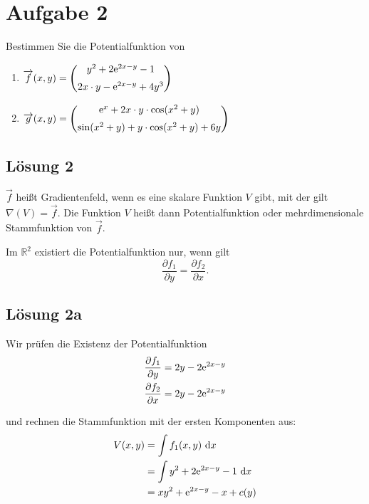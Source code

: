 \documentclass[main.tex]{subfiles}
\begin{document}
\section{Aufgabe 2}
Bestimmen Sie die Potentialfunktion von
\begin{enumerate}
	\item $\begin{aligned}
		\overrightarrow{f}(x,y) 
		= \begin{pmatrix}
			y^2 + 2\text{\rmfamily\upshape e}^{2x - y} - 1 \\[2mm]
			2x \cdot y - \text{\rmfamily\upshape e}^{2x - y} + 4y^3
		\end{pmatrix}
		\end{aligned}$
%
	\item $\begin{aligned}
		\overrightarrow{g}(x,y) 
		= \begin{pmatrix}
			\text{\rmfamily\upshape e}^x + 2x \cdot y \cdot \cos(x^2 + y) \\[2mm]
			\sin(x^2 + y) + y \cdot \cos(x^2 + y) + 6y
		\end{pmatrix}
		\end{aligned}$
\end{enumerate}

\subsection{Lösung 2}

$\vec{f}$ heißt Gradientenfeld, wenn es eine skalare Funktion $V$ gibt, mit der gilt
$\nabla (V) = \vec{f}$. Die Funktion $V$ heißt dann Potentialfunktion oder mehrdimensionale Stammfunktion von $\vec{f}$.

Im $\mathbb{R}^2$ existiert die Potentialfunktion nur, wenn gilt
$$
	\frac{\partial f_1}{\partial y} = \frac{\partial f_2}{\partial x}.
$$

\subsection{Lösung 2a}
Wir prüfen die Existenz der Potentialfunktion 
\begin{align*}
	\frac{\partial f_1}{\partial y} &= 2y - 2\text{\rmfamily\upshape e}^{2x - y} \\
	\frac{\partial f_2}{\partial x} &= 2y - 2\text{\rmfamily\upshape e}^{2x - y} \\
\end{align*}

und rechnen die Stammfunktion mit der ersten Komponenten aus:
\begin{align*}
	V(x,y) &= \int f_1(x,y) ~\mathrm{d}x \\
		   &= \int y^2 + 2\text{\rmfamily\upshape e}^{2x - y} - 1 ~\mathrm{d}x \\
		   &= xy^2 + \text{\rmfamily\upshape e}^{2x - y} - x + c(y) \\
\end{align*}
\end{document}
